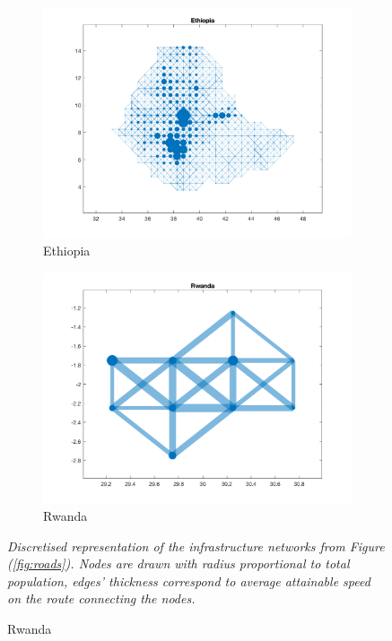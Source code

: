 \documentclass[11pt, oneside]{article}   	%
\let\oldref\ref
\renewcommand{\ref}[1]{(\oldref{#1})}
\newcommand{\mysubcaption}[1]{
\justify
\begin{spacing}{0.7}
\textit{\footnotesize #1}
\end{spacing}}
\begin{document}
\begin{figure}[t]
\begin{subfigure}[c]{0.45\textwidth}
\includegraphics[width=\textwidth, trim={2cm 1cm 1.5cm 0cm},clip]{../../Build/output/Matlab_graphs/Nicer_graphs/Ethiopia_stat.png}
\caption{Ethiopia}
\label{fig:Ethiopia_mat}
\end{subfigure}
\begin{subfigure}[c]{0.45\textwidth}
\includegraphics[width=\textwidth, trim={2cm 1cm 1.5cm 0cm},clip]{../../Build/output/Matlab_graphs/Nicer_graphs/Rwanda_stat.png}
\caption{Rwanda}
\label{fig:Rwanda_mat}
\end{subfigure}
\mysubcaption{Discretised representation of the infrastructure networks from Figure \ref{fig:roads}. Nodes are drawn with radius proportional to total population, edges' thickness correspond to average attainable speed on the route connecting the nodes.}
\label{fig:matlab_networks}
\end{figure}
\end{document}
